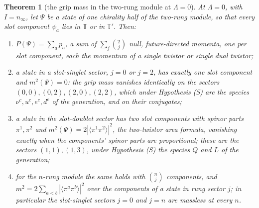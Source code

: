 \documentclass[11pt]{article}
\newtheorem{theorem}{Theorem}[section]
\theoremstyle{definition}
\newcommand{\T}{\mathbb{T}}
\newcommand{\br}[1]{\langle #1\rangle}
\begin{document}
\begin{theorem}[the grip mass in the two-rung module at $\Lambda = 0$]\label{thm:mass}
At $\Lambda = 0$, with $I = n_{\infty}$, let $\Psi$ be a state of one chirality half of the two-rung module, so that every slot component $\psi_{a}$ lies in $\T$ or in $\T'$. Then:
\begin{enumerate}
\item[(i)] $P(\Psi) = \sum_{a} p_{a}$, a sum of $\sum_{j}\binom{2}{j}$ null, future-directed momenta, one per slot component, each the momentum of a single twistor or single dual twistor;
\item[(ii)] a state in a slot-singlet sector, $j = 0$ or $j = 2$, has exactly one slot component and $m^{2}(\Psi) = 0$: the grip mass vanishes identically on the sectors $(0,0), (0,2), (2,0), (2,2)$, which under Hypothesis (S) are the species $\nu^{c}, u^{c}, e^{c}, d^{c}$ of the generation, and on their conjugates;
\item[(iii)] a state in the slot-doublet sector has two slot components with spinor parts $\pi^{1}, \pi^{2}$ and $m^{2}(\Psi) = 2|\br{\pi^{1}\pi^{2}}|^{2}$, the two-twistor area formula, vanishing exactly when the components' spinor parts are proportional; these are the sectors $(1,1), (1,3)$, under Hypothesis (S) the species $Q$ and $L$ of the generation;
\item[(iv)] for the $n$-rung module the same holds with $\binom{n}{j}$ components, and $m^{2} = 2\sum_{a < b}|\br{\pi^{a}\pi^{b}}|^{2}$ over the components of a state in rung sector $j$; in particular the slot-singlet sectors $j = 0$ and $j = n$ are massless at every $n$.
\end{enumerate}
\end{theorem}
\end{document}
